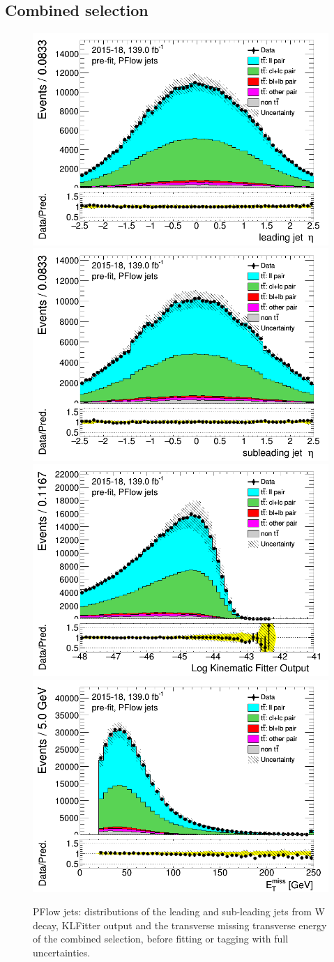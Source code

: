 \documentclass[letterpaper,12pt]{article}
\begin{document}
	

	\newpage
	\subsection{Combined selection}
	\label{sec:appendix_combined_selection}
	\newpage	
	\begin{figure}[H]
	\includegraphics[width=.45\textwidth]{FTAG_plots/pretagNoRwwithhighpTPFlowall/DataMC_h_J0_eta.png}
	\includegraphics[width=.45\textwidth]{FTAG_plots/pretagNoRwwithhighpTPFlowall/DataMC_h_J1_eta.png}\\
	\includegraphics[width=.45\textwidth]{FTAG_plots/pretagNoRwwithhighpTPFlowall/DataMC_h_LLR.png}
	\includegraphics[width=.45\textwidth]{FTAG_plots/pretagNoRwwithhighpTPFlowall/DataMC_h_MET.png}\\
	
	\caption{PFlow jets: distributions of the leading and sub-leading jets 
	from W decay, KLFitter output and the transverse missing transverse 
	energy of the combined selection, before fitting or tagging with 
	full uncertainties.} \label{fig:combined_jets_VRJets}
	\end{figure}
	
\end{document}

